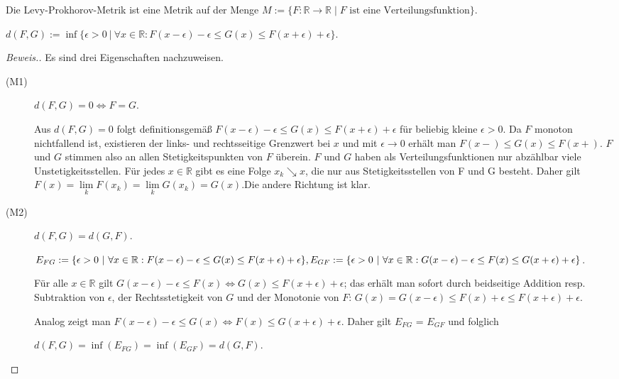 \begin{lemma}
    Die Levy-Prokhorov-Metrik ist eine Metrik auf der Menge $M:=\{F:\mathbb{R}\to\mathbb{R}\mid F \text{ ist eine Verteilungsfunktion}\}$.
    \begin{center}
        $d(F,G) := \inf\{\epsilon > 0~|~ \forall x \in \mathbb{R}: F(x-\epsilon) - \epsilon \leq G(x) \leq F(x+\epsilon) + \epsilon \}.$ 
    \end{center}
\end{lemma}
\begin{proof}[Beweis.] Es sind drei Eigenschaften nachzuweisen.
    \begin{description}
    \item[(M1)] $d(F,G) = 0 \Leftrightarrow F = G$.

    Aus $d(F,G) = 0$ folgt definitionsgemäß $F(x-\epsilon) - \epsilon \leq G(x) \leq F(x+\epsilon) + \epsilon$ für beliebig kleine $\epsilon > 0$. Da $F$ monoton nichtfallend ist, existieren der links- und rechtsseitige Grenzwert bei $x$ und mit $\epsilon \rightarrow 0$ erhält man $F(x-) \leq G(x) \leq F(x+)$. $F$ und $G$ stimmen also an allen Stetigkeitspunkten von $F$ überein. $F$ und $G$ haben als Verteilungsfunktionen nur abzählbar viele Unstetigkeitsstellen. Für jedes $x \in \mathbb{R}$ gibt es eine Folge $x_{k} \searrow x$, die nur aus Stetigkeitsstellen von F und G besteht. Daher gilt $F(x) = \lim\limits_{k}{F(x_k)} = \lim\limits_{k}{G(x_k)} = G(x)$.\newline Die andere Richtung ist klar.

    \item[(M2)] $d(F,G) = d(G,F)$.

    $E_{FG} := \{\epsilon > 0~|~\forall x \in \mathbb{R}: F(x-\epsilon) - \epsilon \leq G(x) \leq F(x+\epsilon) + \epsilon\},\newline E_{GF} := \{\epsilon > 0~|~\forall x \in \mathbb{R}: G(x-\epsilon) - \epsilon \leq F(x) \leq G(x+\epsilon) + \epsilon\}$.

    Für alle $x \in \mathbb{R}$ gilt $G(x-\epsilon) - \epsilon \leq F(x) \Leftrightarrow G(x) \leq F(x+\epsilon) + \epsilon$; das erhält man sofort durch beidseitige Addition resp. Subtraktion von $\epsilon$, der Rechtsstetigkeit von $G$ und der Monotonie von $F$:
    $G(x) = G(x-\epsilon) \leq F(x) + \epsilon \leq F(x+\epsilon) + \epsilon.$

    Analog zeigt man $F(x-\epsilon) - \epsilon \leq G(x) \Leftrightarrow F(x) \leq G(x+\epsilon) + \epsilon$. Daher gilt $E_{FG}$ = $E_{GF}$ und folglich 
    \begin{center}
        $d(F,G) = \inf(E_{FG}) = \inf(E_{GF}) = d(G,F).$
    \end{center}


\end{description}
\end{proof}
